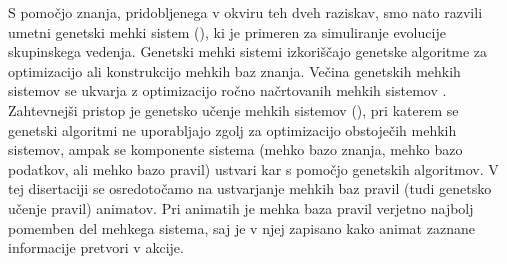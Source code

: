\begin{razsirjeniPovzetek}
S pomočjo znanja, pridobljenega v okviru teh dveh raziskav, smo nato razvili umetni genetski mehki sistem (), ki je primeren za simuliranje evolucije skupinskega vedenja. Genetski mehki sistemi \cite{cordon2001genetic,cordon2004ten,fernandez2015revisiting,herrera1996genetic,herrera2008genetic,pedrycz1996fuzzy,sanchez1997genetic} izkoriščajo genetske algoritme za optimizacijo ali konstrukcijo mehkih baz znanja. Večina genetskih mehkih sistemov se ukvarja z optimizacijo ročno načrtovanih mehkih sistemov \cite{cordon2004ten,fernandez2015revisiting,herrera2008genetic}. Zahtevnejši pristop je genetsko učenje mehkih sistemov (), pri katerem se genetski algoritmi ne uporabljajo zgolj za optimizacijo obstoječih mehkih sistemov, ampak se komponente sistema (mehko bazo znanja, mehko bazo podatkov, ali mehko bazo pravil) ustvari kar s pomočjo genetskih algoritmov. V tej disertaciji se osredotočamo na ustvarjanje mehkih baz pravil (tudi genetsko učenje pravil) animatov. Pri animatih je mehka baza pravil verjetno najbolj pomemben del mehkega sistema, saj je v njej zapisano kako animat zaznane informacije pretvori v akcije.


\end{razsirjeniPovzetek}
